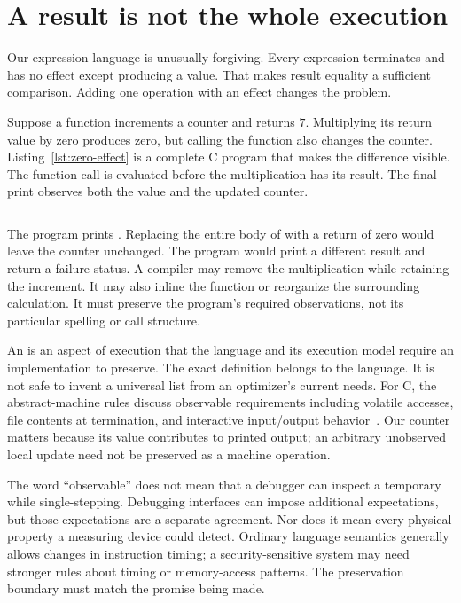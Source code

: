 \section{A result is not the whole execution}
\label{sec:observable-behavior}

Our expression language is unusually forgiving.
Every expression terminates and has no effect except producing a value.
That makes result equality a sufficient comparison.
Adding one operation with an effect changes the problem.

Suppose a function increments a counter and returns $7$.
Multiplying its return value by zero produces zero, but calling the function also changes the counter.
Listing~\ref{lst:zero-effect} is a complete C program that makes the difference visible.
The function call is evaluated before the multiplication has its result.
The final print observes both the value and the updated counter.

\begin{listing}
  \inputminted{c}{example-code/ch01/observations.c}
  \caption{A zero result does not make the function call's effect dispensable.}
  \label{lst:zero-effect}
\end{listing}

The program prints .
Replacing the entire body of  with a return of zero would leave the counter unchanged.
The program would print a different result and return a failure status.
A compiler may remove the multiplication while retaining the increment.
It may also inline the function or reorganize the surrounding calculation.
It must preserve the program's required observations, not its particular spelling or call structure.

An  is an aspect of execution that the language and its execution model require an implementation to preserve.
The exact definition belongs to the language.
It is not safe to invent a universal list from an optimizer's current needs.
For C, the abstract-machine rules discuss observable requirements including volatile accesses, file contents at termination, and interactive input/output behavior~\cite[Section~5.1.2.3]{wg14-2011-c11}.
Our counter matters because its value contributes to printed output; an arbitrary unobserved local update need not be preserved as a machine operation.

The word \enquote{observable} does not mean that a debugger can inspect a temporary while single-stepping.
Debugging interfaces can impose additional expectations, but those expectations are a separate agreement.
Nor does it mean every physical property a measuring device could detect.
Ordinary language semantics generally allows changes in instruction timing; a security-sensitive system may need stronger rules about timing or memory-access patterns.
The preservation boundary must match the promise being made.

